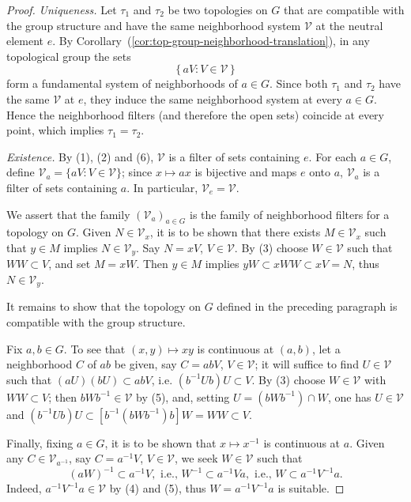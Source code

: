 \begin{proof}
    \textit{Uniqueness.}
    Let $\tau_1$ and $\tau_2$ be two topologies on $G$ that are compatible with the group structure and have the same neighborhood system $\mathcal V$ at the neutral element $e$.
    By Corollary~(\ref{cor:top-group-neighborhood-translation}), in any topological group the sets
    \[
        \{\,aV : V\in\mathcal V\,\}
    \]
    form a fundamental system of neighborhoods of $a\in G$. Since both $\tau_1$ and $\tau_2$ have the same $\mathcal V$ at $e$, they induce the same neighborhood system at every $a\in G$. Hence the neighborhood filters (and therefore the open sets) coincide at every point, which implies $\tau_1=\tau_2$.


    \textit{Existence.}
    By \textup{(1)}, \textup{(2)} and \textup{(6)}, \( \mathcal{V} \) is a filter of sets containing \( e \). For each \( a \in G \), define \( \mathcal{V}_a = \{ aV : V \in \mathcal{V} \} \); since \( x \mapsto ax \) is bijective and maps \( e \) onto \( a \), \( \mathcal{V}_a \) is a filter of sets containing \( a \). In particular, \( \mathcal{V}_e = \mathcal{V} \).

    We assert that the family \( (\mathcal{V}_a)_{a \in G} \) is the family of neighborhood filters for a topology on \( G \). Given \( N \in \mathcal{V}_x \), it is to be shown that there exists \( M \in \mathcal{V}_x \) such that \( y \in M \) implies \( N \in \mathcal{V}_y \). Say \( N = xV \), \( V \in \mathcal{V} \). By \textup{(3)} choose \( W \in \mathcal{V} \) such that \( WW \subset V \), and set \( M = xW \). Then \( y \in M \) implies \( yW \subset xWW \subset xV = N \), thus \( N \in \mathcal{V}_y \).

    It remains to show that the topology on \( G \) defined in the preceding paragraph is compatible with the group structure.

    Fix \( a, b \in G \). To see that \( (x, y) \mapsto xy \) is continuous at \( (a, b) \), let a neighborhood \( C \) of \( ab \) be given, say \( C = abV \), \( V \in \mathcal{V} \); it will suffice to find \( U \in \mathcal{V} \) such that \( (aU)(bU) \subset abV \), i.e. \( (b^{-1}Ub)U \subset V \). By \textup{(3)} choose \( W \in \mathcal{V} \) with \( WW \subset V \); then \( bWb^{-1} \in \mathcal{V} \) by \textup{(5)}, and, setting \( U = (bWb^{-1}) \cap W \), one has
    \( U \in \mathcal{V} \) and \( (b^{-1}Ub)U \subset [b^{-1}(bWb^{-1})b]W = WW \subset V \).


    Finally, fixing \( a \in G \), it is to be shown that \( x \mapsto x^{-1} \) is continuous at \( a \).
    Given any \( C \in \mathcal{V}_{a^{-1}} \), say \( C = a^{-1}V \), \( V \in \mathcal{V} \), we seek \( W \in \mathcal{V} \) such that
    \[
        (aW)^{-1} \subset a^{-1}V, \text{ i.e., } W^{-1} \subset a^{-1}Va, \text{ i.e., } W \subset a^{-1}V^{-1}a.
    \]
    Indeed, \( a^{-1}V^{-1}a \in \mathcal{V} \) by \textup{(4)} and \textup{(5)}, thus \( W = a^{-1}V^{-1}a \) is suitable.


\end{proof}


